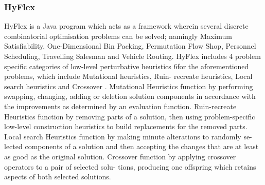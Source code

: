 \documentclass[a4paper,12pt]{article}
\begin{document}
            \subsubsection{HyFlex}
                \par{
                    HyFlex is a Java program which acts as a framework wherein several discrete
                    combinatorial optimisation problems can be solved; namingly Maximum Satisfiability, 
                    One-Dimensional Bin Packing, Permutation Flow Shop, Personnel
                    Scheduling, Travelling Salesman and Vehicle Routing.\newline 
                    \newline 
                    HyFlex includes 4 problem specific categories of low-level perturbative heuristics
                    6for the aforementioned problems, which include Mutational heuristics, Ruin-
                    recreate heuristics, Local search heuristics and Crossover \cite{hyperheuristictas}.
                    Mutational Heuristics function by performing swapping, changing, adding or
                    deletion solution components in accordance with the improvements as determined by an 
                    evaluation function.\newline 
                    \newline 
                    Ruin-recreate Heuristics function by removing parts of a solution, then using
                    problem-specific low-level construction heuristics to build replacements for the
                    removed parts.\newline 
                    \newline 
                    Local search Heuristics function by making minute alterations to randomly se-
                    lected components of a solution and then accepting the changes that are at least
                    as good as the original solution.\newline 
                    \newline 
                    Crossover function by applying crossover operators to a pair of selected solu-
                    tions, producing one offspring which retains aspects of both selected solutions.
                }
\end{document}

